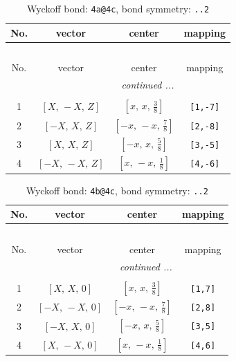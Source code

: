 \documentclass[fleqn,8pt]{jsarticle}
\begin{document}
\begin{longtable}{cccc}
\caption{Wyckoff bond: {\tt 4a@4c}, bond symmetry: {\tt ..2}}
 \\
 \hline \hline
No. & vector & center & mapping \\ \hline \endfirsthead

\multicolumn{3}{l}{\tablename\ \thetable{}} \\
 \hline \hline
No. & vector & center & mapping \\ \hline \endhead

 \hline \hline
\multicolumn{3}{r}{\footnotesize\it continued ...} \\ \endfoot

 \hline \hline
\multicolumn{3}{r}{} \\ \endlastfoot

1 & $\left[ X,\, - X,\, Z \right]$ & $\left[ x,\, x,\, \frac{3}{8} \right]$ & {\tt [1,-7]} \\ \hline
2 & $\left[ - X,\, X,\, Z \right]$ & $\left[ - x,\, - x,\, \frac{7}{8} \right]$ & {\tt [2,-8]} \\ \hline
3 & $\left[ X,\, X,\, Z \right]$ & $\left[ - x,\, x,\, \frac{5}{8} \right]$ & {\tt [3,-5]} \\ \hline
4 & $\left[ - X,\, - X,\, Z \right]$ & $\left[ x,\, - x,\, \frac{1}{8} \right]$ & {\tt [4,-6]} \\
\end{longtable}
\renewcommand{\arraystretch}{1.2}
\begin{longtable}{cccc}
\caption{Wyckoff bond: {\tt 4b@4c}, bond symmetry: {\tt ..2}}
 \\
 \hline \hline
No. & vector & center & mapping \\ \hline \endfirsthead

\multicolumn{3}{l}{\tablename\ \thetable{}} \\
 \hline \hline
No. & vector & center & mapping \\ \hline \endhead

 \hline \hline
\multicolumn{3}{r}{\footnotesize\it continued ...} \\ \endfoot

 \hline \hline
\multicolumn{3}{r}{} \\ \endlastfoot

1 & $\left[ X,\, X,\, 0 \right]$ & $\left[ x,\, x,\, \frac{3}{8} \right]$ & {\tt [1,7]} \\ \hline
2 & $\left[ - X,\, - X,\, 0 \right]$ & $\left[ - x,\, - x,\, \frac{7}{8} \right]$ & {\tt [2,8]} \\ \hline
3 & $\left[ - X,\, X,\, 0 \right]$ & $\left[ - x,\, x,\, \frac{5}{8} \right]$ & {\tt [3,5]} \\ \hline
4 & $\left[ X,\, - X,\, 0 \right]$ & $\left[ x,\, - x,\, \frac{1}{8} \right]$ & {\tt [4,6]} \\
\end{longtable}
\end{document}
